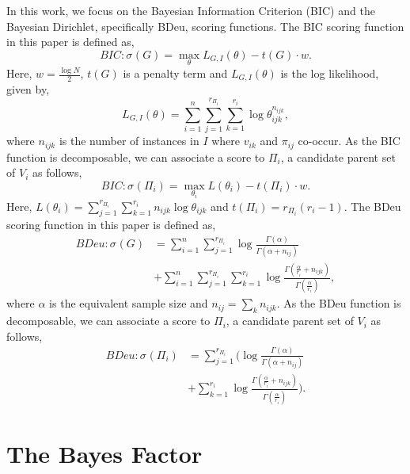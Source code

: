 \documentclass[letterpaper]{article}
\newcommand{\graph}{\mathit{G}}
\newcommand{\vertex}[1]{V_{#1}}
\newcommand{\score}[2]{\sigma_{#1}({#2})}
\begin{document}
In this work, we focus on the Bayesian Information Criterion (BIC) and the Bayesian Dirichlet, specifically BDeu, scoring functions. The BIC scoring function in this paper is defined as,
\begin{equation*}
    BIC : \score{}{\graph} = \max_{\theta} L_{G,I} (\theta) - t({G})\cdot w.
\end{equation*}
Here, $w = \frac{\log N}{2}$, $t(G)$ is a penalty term and $L_{G,I} (\theta)$ is the log likelihood, given by,
\begin{equation*}
    L_{G,I} (\theta) = \displaystyle  \sum_{i=1}^n \sum_{j=1}^{r_{\Pi_i}} \sum_{k=1}^{r_i} \log \theta_{ijk}^{n_{ijk}} ,
\end{equation*}
where $n_{ijk}$ is the number of instances in $I$ where $v_{ik}$ and $\pi_{ij}$ co-occur.
As the BIC function is decomposable, we can associate a score to $\Pi_i$, a candidate parent set of $\vertex{i}$ as follows,
\begin{equation*}
    BIC : \score{}{\Pi_i} = \max_{\theta_i} L(\theta_i) - t({\Pi_i})\cdot w.
\end{equation*}
Here, $L (\theta_i) =\sum_{j=1}^{r_{\Pi_i}}\sum_{k=1}^{r_i} n_{ijk} \log \theta_{ijk}$ and $t(\Pi_i) = r_{\Pi_i}(r_i -1)$.
The BDeu scoring function in this paper is defined as,
\begin{align*}
    BDeu : \score{}{G} &= \displaystyle  \sum_{i=1}^n \sum_{j=1}^{r_{\Pi_i}} \log \frac{\Gamma (\alpha)}{ \Gamma(\alpha + n_{ij})} \\&+  \sum_{i=1}^n \sum_{j=1}^{r_{\Pi_i}} \sum_{k=1}^{r_i} \log \frac{\Gamma (\frac{\alpha}{r_i}+ n_{ijk})}{\Gamma(\frac{\alpha}{r_i})},
\end{align*}
where $\alpha$ is the equivalent sample size and $n_{ij} = \sum_k n_{ijk}$.
As the BDeu function is decomposable, we can associate a score to $\Pi_i$, a candidate parent set of $\vertex{i}$ as follows,
\begin{align*}
    BDeu : \score{}{\Pi_i} &= \displaystyle  \sum_{j=1}^{r_{\Pi_i}} \Bigg(\log \frac{\Gamma (\alpha)}{ \Gamma(\alpha + n_{ij})} \\&+ \sum_{k=1}^{r_i} \log \frac{\Gamma (\frac{\alpha}{r_i}+ n_{ijk})}{\Gamma(\frac{\alpha}{r_i})} \Bigg).
\end{align*}

\section{The Bayes Factor}\label{sec:bf}
\end{document}
